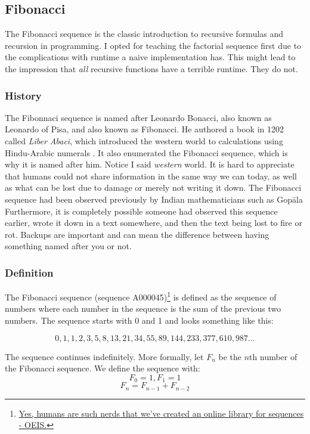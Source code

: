 \subsection{Fibonacci}

The Fibonacci sequence is the classic introduction to recursive formulas and recursion in programming.  I opted for teaching the factorial sequence first due to the complications with runtime a naive implementation has.  This might lead to the impression that \textit{all} recursive functions have a terrible runtime.  They do not.  





\subsubsection{History}
The Fibonnaci sequence is named after Leonardo Bonacci, also known as Leonardo of Pisa, and also known as Fibonacci.  He authored a book in 1202 called \textit{Liber Abaci}, which introduced the western world to calculations using Hindu-Arabic numerals .  It also enumerated the Fibonacci sequence, which is why it is named after him\cite{Bonacci1202,sigler2002fibonacci}.   Notice I said \textit{western} world.  It is hard to appreciate that humans could not share information in the same way we can today, as well as what can be lost due to damage or merely not writing it down.   The Fibonacci sequence had been observed previously by Indian mathematicians such as Gop\={a}la  \cite{singh1985fib}
Furthermore, it is completely possible someone had observed this sequence earlier, wrote it down in a text somewhere, and then the text being lost to fire or rot.  Backups are important and can mean the difference between having something named after you or not.

\subsubsection{Definition}
The Fibonacci sequence  (sequence A000045)\footnote{\href{https://oeis.org/}{Yes, humans are such nerds that we've created an online library for sequences - OEIS.}} is defined as the sequence of numbers where each number in the sequence is the sum of the previous two numbers.  The sequence starts with 0 and 1  and looks something like this:

$$0, 1, 1, 2, 3, 5, 8, 13, 21, 34, 55, 89, 144, 233, 377, 610, 987...$$

The sequence continues indefinitely. More formally, let $F_n$ be the $n$th number of the Fibonacci sequence. We define the sequence with:
$$ F_{0} = 1, F_{1} = 1$$
$$ F_n = F_{n-1} + F_{n-2}$$



